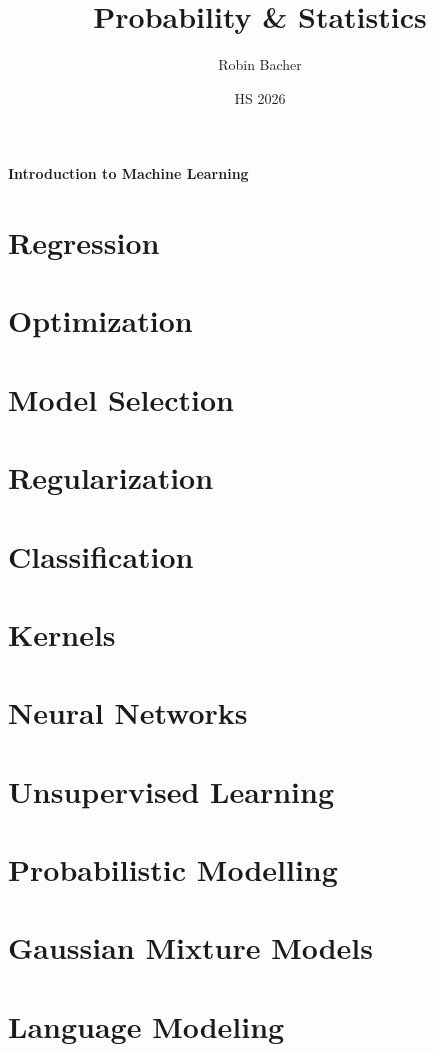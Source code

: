 \documentclass[a4paper,10pt]{article}
\title{Probability \& Statistics}
\author{Robin Bacher}
\date{HS 2026}
\begin{document}
{\large
    \textbf{Introduction to Machine Learning}
}



\newpage
\section{Regression}


\newpage
\section{Optimization}


\newpage
\section{Model Selection}


\newpage
\section{Regularization}


\newpage
\section{Classification}


\section{Kernels}


\newpage
\section{Neural Networks}


\newpage
\section{Unsupervised Learning}


\newpage
\section{Probabilistic Modelling}


\newpage
\section{Gaussian Mixture Models}


\newpage
\section{Language Modeling}

\end{document}
